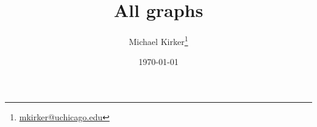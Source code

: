 \documentclass[12pt,landscape]{article}
\begin{document}


\title{All graphs}
\author{Michael Kirker\thanks{\href{mailto:mkirker@uchicago.edu}{mkirker@uchicago.edu}}}
\date{\today}
















\end{document}

